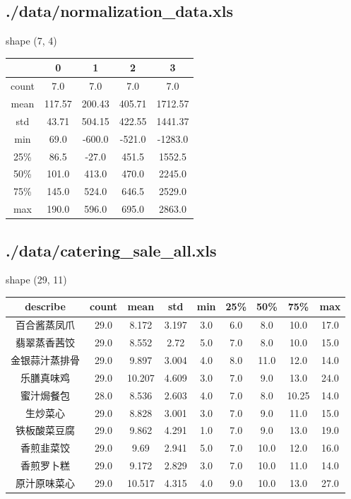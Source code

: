 \documentclass{article}
\begin{document}
    \subsection{./data/normalization\_data.xls}
        shape (7, 4)\\
        \begin{tabular}{| c | c | c | c | c |}\hline
                  & 0 & 1 & 2 & 3\\\hline
            count & 7.0 & 7.0 & 7.0 & 7.0\\\hline
            mean & 117.57 & 200.43 & 405.71 & 1712.57\\\hline
            std & 43.71 & 504.15 & 422.55 & 1441.37\\\hline
            min & 69.0 & -600.0 & -521.0 & -1283.0\\\hline
            25\% & 86.5 & -27.0 & 451.5 & 1552.5\\\hline
            50\% & 101.0 & 413.0 & 470.0 & 2245.0\\\hline
            75\% & 145.0 & 524.0 & 646.5 & 2529.0\\\hline
            max & 190.0 & 596.0 & 695.0 & 2863.0\\\hline
        \end{tabular}
    \subsection{./data/catering\_sale\_all.xls}
        shape (29, 11)\\
        \begin{tabular}{| c | c | c | c | c | c | c | c | c |}\hline
            describe & count & mean & std & min & 25\% & 50\% & 75\% & max\\\hline
            百合酱蒸凤爪 & 29.0 & 8.172 & 3.197 & 3.0 & 6.0 & 8.0 & 10.0 & 17.0\\\hline
            翡翠蒸香茜饺 & 29.0 & 8.552 & 2.72 & 5.0 & 7.0 & 8.0 & 10.0 & 15.0\\\hline
            金银蒜汁蒸排骨 & 29.0 & 9.897 & 3.004 & 4.0 & 8.0 & 11.0 & 12.0 & 14.0\\\hline
            乐膳真味鸡 & 29.0 & 10.207 & 4.609 & 3.0 & 7.0 & 9.0 & 13.0 & 24.0\\\hline
            蜜汁焗餐包 & 28.0 & 8.536 & 2.603 & 4.0 & 7.0 & 8.0 & 10.25 & 14.0\\\hline
            生炒菜心 & 29.0 & 8.828 & 3.001 & 3.0 & 7.0 & 9.0 & 11.0 & 15.0\\\hline
            铁板酸菜豆腐 & 29.0 & 9.862 & 4.291 & 1.0 & 7.0 & 9.0 & 13.0 & 19.0\\\hline
            香煎韭菜饺 & 29.0 & 9.69 & 2.941 & 5.0 & 7.0 & 10.0 & 12.0 & 16.0\\\hline
            香煎罗卜糕 & 29.0 & 9.172 & 2.829 & 3.0 & 7.0 & 10.0 & 11.0 & 14.0\\\hline
            原汁原味菜心 & 29.0 & 10.517 & 4.315 & 4.0 & 9.0 & 10.0 & 13.0 & 27.0\\\hline
        \end{tabular}
\end{document}
